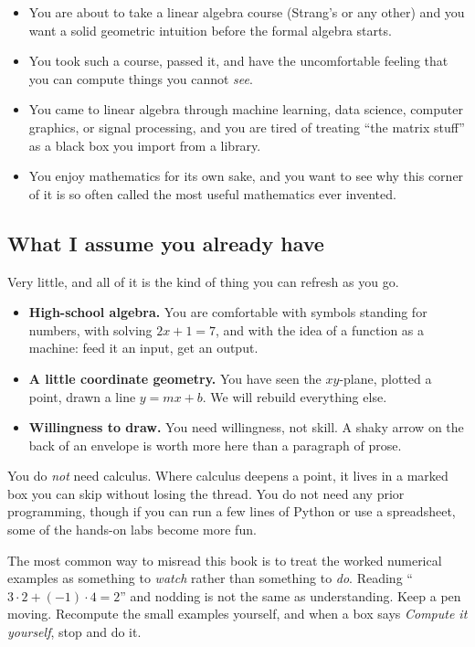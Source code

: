 \begin{itemize}
\item You are about to take a linear algebra course (Strang's or any other) and
you want a solid geometric intuition before the formal algebra starts.
\item You took such a course, passed it, and have the uncomfortable feeling that
you can compute things you cannot \emph{see}.
\item You came to linear algebra through machine learning, data science, computer
graphics, or signal processing, and you are tired of treating ``the matrix stuff''
as a black box you import from a library.
\item You enjoy mathematics for its own sake, and you want to see why this corner
of it is so often called the most useful mathematics ever invented.
\end{itemize}

\subsection*{What I assume you already have}

Very little, and all of it is the kind of thing you can refresh as you go.

\begin{itemize}
\item \textbf{High-school algebra.} You are comfortable with symbols standing for
numbers, with solving $2x + 1 = 7$, and with the idea of a function as a machine:
feed it an input, get an output.
\item \textbf{A little coordinate geometry.} You have seen the $xy$-plane, plotted
a point, drawn a line $y = mx + b$. We will rebuild everything else.
\item \textbf{Willingness to draw.} You need willingness, not skill. A shaky arrow
on the back of an envelope is worth more here than a paragraph of prose.
\end{itemize}

You do \emph{not} need calculus. Where calculus deepens a point, it lives in a
marked box you can skip without losing the thread. You do not need any
prior programming, though if you can run a few lines of Python or use a
spreadsheet, some of the hands-on labs become more fun.

\begin{trapbox}
The most common way to misread this book is to treat the worked numerical
examples as something to \emph{watch} rather than something to \emph{do}. Reading
``$3 \cdot 2 + (-1)\cdot 4 = 2$'' and nodding is not the same as understanding.
Keep a pen moving. Recompute the small examples yourself, and when a box says
\emph{Compute it yourself}, stop and do it.
\end{trapbox}

